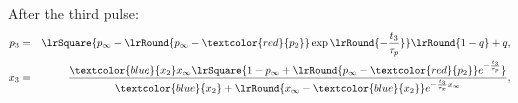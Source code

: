 \documentclass[8pt]{beamer}
\begin{document}
\begin{frame}
\begin{tiny}
After the third pulse:
\begin{eqnarray}
p_3 
&=& \lrSquare{p_{\infty} - \lrRound{p_{\infty}- \textcolor{red}{p_2}}
  \exp\lrRound{-\frac{t_3}{\tau_p}}}\lrRound{1-q} + q,
\\
x_{3} 
&=& \frac{{\textcolor{blue}{x_{2}}} x_{\infty} \lrSquare{1-p_{\infty} + \lrRound{p_{\infty}- \textcolor{red}{p_{2}}}
e^{-\frac{t_3}{\tau_p}}}}
{ {\textcolor{blue}{x_{2}}} + \lrRound{x_{\infty}- \textcolor{blue}{x_{2}}}
e^{-\frac{t_3}{\tau_x}x_{\infty} }}, 
\end{eqnarray}

\end{tiny}
\end{frame}


\end{document}
